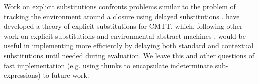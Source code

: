 Work on explicit substitutions confronts problems similar to the problem of tracking the environment around a closure using delayed substitutions \cite{Abadi:1991fr,levy1999explicit,Abadi:1990ys}.  \citet{DBLP:journals/corr/abs-1009-2789} have developed a theory of explicit substitutions for CMTT, which, following other work on explicit substitutions and environmental abstract machines \cite{DBLP:journals/tcs/Curien91}, would be useful in implementing \HazelnutLive more efficiently by delaying both standard and contextual substitutions until needed during evaluation. We leave this and other questions of fast implementation (e.g. using thunks to encapsulate indeterminate sub-expressions) to future work. 






